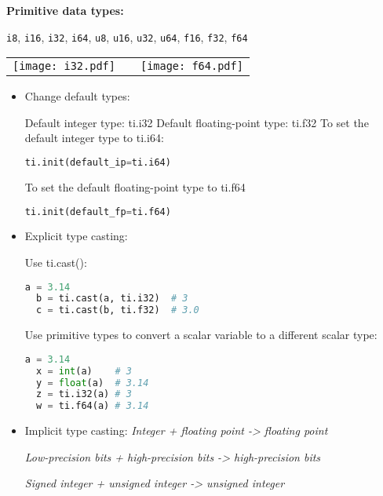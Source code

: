 \documentclass[10pt,landscape,a4paper]{article}
\newenvironment{myboxed}[1]
{\begin{mdframed}[linecolor=black,
                  backgroundcolor=white,
                  outerlinewidth=0.25pt,
                  innertopmargin=1ex,
                  topline=true,
                  rightline=true,
                  leftline=true,
                  bottomline=true,
                  linecolor=black!0,
                  frametitleaboveskip=0.5em,
                  frametitlebelowskip=0.5em,
                  innerbottommargin=.5\baselineskip,
                  innerrightmargin=.5em,
                  innerleftmargin=.5em,
                  frametitle={\footnotesize \RobotoSlab \bfseries \hspace*{0mm} #1},
                  frametitlebackgroundcolor=black!5,
                  frametitlerulewidth=2pt]}
{\end{mdframed}}
\begin{document}
\begin{multicols*}{5}
  \begin{myboxed}{Data Types}

  \textbf{Primitive data types:}
    
  \verb|i8|,	\verb|i16|,	\verb|i32|,	\verb|i64|,	\verb|u8|,	\verb|u16|,	\verb|u32|,	\verb|u64|,	\verb|f16|,	\verb|f32|,	\verb|f64|
    
  \begin{tabular}{ |c|c|c| }
    \texttt{[image: i32.pdf]} &  & \texttt{[image: f64.pdf]} \\
    \end{tabular}

  \begin{itemize}
  \item Change default types:

  Default integer type: ti.i32 
  Default floating-point type: ti.f32
  To set the default integer type to ti.i64:
  \begin{lstlisting}[language=Python]
  ti.init(default_ip=ti.i64)
  \end{lstlisting}
  To set the default floating-point type to ti.f64
  \begin{lstlisting}[language=Python]
  ti.init(default_fp=ti.f64)
  \end{lstlisting}

  \item Explicit type casting:

  Use ti.cast():
  \begin{lstlisting}[language=Python]
  a = 3.14 
  b = ti.cast(a, ti.i32)  # 3
  c = ti.cast(b, ti.f32)  # 3.0
  \end{lstlisting}
  Use primitive types to convert a scalar variable to a different scalar type:
  \begin{lstlisting}[language=Python]
  a = 3.14
  x = int(a)    # 3
  y = float(a)  # 3.14
  z = ti.i32(a) # 3
  w = ti.f64(a) # 3.14
  \end{lstlisting}

  \item Implicit type casting:
  \textit{Integer + floating point -> floating point}

  \textit{Low-precision bits + high-precision bits -> high-precision bits}

  \textit{Signed integer + unsigned integer -> unsigned integer}

  \end{itemize}


\end{myboxed}
\end{multicols*}
\end{document}
